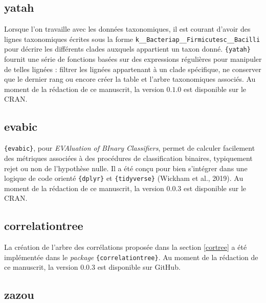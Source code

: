 \documentclass[12pt,a4paper]{reedthesis}
\theoremstyle{definition}
\theoremstyle{definition}
\theoremstyle{definition}
\theoremstyle{remark}
\begin{document}
\hypertarget{yatah}{%
\subsection*{yatah}\label{yatah}}

Lorsque l'on travaille avec les données taxonomiques, il est courant d'avoir des lignes taxonomiques écrites sous la forme \texttt{k\_\_Bacteria\textbar{}p\_\_Firmicutes\textbar{}c\_\_Bacilli} pour décrire les différents clades auxquels appartient un taxon donné. \texttt{\{yatah\}} fournit une série de fonctions basées sur des expressions régulières pour manipuler de telles lignées : filtrer les lignées appartenant à un clade spécifique, ne conserver que le dernier rang ou encore créer la table et l'arbre taxonomiques associés. Au moment de la rédaction de ce manuscrit, la version \(0.1.0\) est disponible sur le CRAN.

\hypertarget{evabic}{%
\subsection*{evabic}\label{evabic}}

\texttt{\{evabic\}}, pour \emph{EVAluation of BInary Classifiers}, permet de calculer facilement des métriques associées à des procédures de classification binaires, typiquement rejet ou non de l'hypothèse nulle. Il a été conçu pour bien s'intégrer dans une logique de code orienté \texttt{\{dplyr\}} et \texttt{\{tidyverse\}} (Wickham et al., 2019). Au moment de la rédaction de ce manuscrit, la version \(0.0.3\) est disponible sur le CRAN.

\hypertarget{correlationtree}{%
\subsection*{correlationtree}\label{correlationtree}}

La création de l'arbre des corrélations proposée dans la section \ref{cortree} a été implémentée dans le \emph{package} \texttt{\{correlationtree\}}. Au moment de la rédaction de ce manuscrit, la version \(0.0.3\) est disponible sur GitHub.

\hypertarget{zazou}{%
\subsection*{zazou}\label{zazou}}
\end{document}
